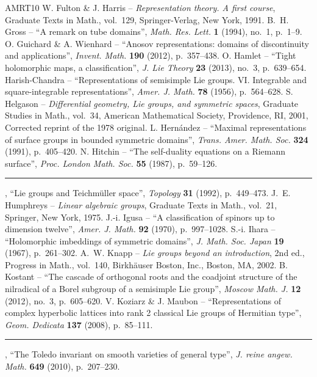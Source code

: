 \documentclass[10pt]{article}
\theoremstyle{definition}
\numberwithin{equation}{section}
\begin{document}
{\begin{thebibliography}{AMRT10}
 W. Fulton \& J. Harris -- \emph{Representation theory. A first course}, Graduate Texts in Math., vol.~129, Springer-Verlag, New York, 1991.
 B.~H. Gross -- ``A remark on tube domains'', \emph{Math. Res. Lett.} \textbf{1} (1994), no.~1, p.~1--9.
 O. Guichard \& A. Wienhard -- ``Anosov representations: domains of discontinuity and applications'', \emph{Invent. Math.} \textbf{190} (2012), p.~357--438.
 O. Hamlet -- ``Tight holomorphic maps, a classification'', \emph{J. Lie Theory} \textbf{23} (2013), no.~3, p.~639--654.
 Harish-Chandra -- ``Representations of semisimple Lie groups. VI. Integrable and square-integrable representations'', \emph{Amer. J. Math.} \textbf{78} (1956), p.~564--628.
 S. Helgason -- \emph{Differential geometry, Lie groups, and symmetric spaces}, Graduate Studies in Math., vol.~34, American Mathematical Society, Providence, RI, 2001, Corrected reprint of the 1978 original.
 L. Hernández -- ``Maximal representations of surface groups in bounded symmetric domains'', \emph{Trans. Amer. Math. Soc.} \textbf{324} (1991), p.~405--420.
 N. Hitchin -- ``The self-duality equations on a Riemann surface'', \emph{Proc. London Math. Soc.} \textbf{55} (1987), p.~59--126.
 \rule{1.2em}{.1pt}, ``Lie groups and Teichmüller space'', \emph{Topology} \textbf{31} (1992), p.~449--473.
 J.~E. Humphreys -- \emph{Linear algebraic groups}, Graduate Texts in Math., vol.~21, Springer, New York, 1975.
 J.-i. Igusa -- ``A classification of spinors up to dimension twelve'', \emph{Amer. J. Math.} \textbf{92} (1970), p.~997--1028.
 S.-i. Ihara -- ``Holomorphic imbeddings of symmetric domains'', \emph{J. Math. Soc. Japan} \textbf{19} (1967), p.~261--302.
 A.~W. Knapp -- \emph{Lie groups beyond an introduction}, 2nd ed., Progress in Math., vol.~140, Birkhäuser Boston, Inc., Boston, MA, 2002.
 B. Kostant -- ``The cascade of orthogonal roots and the coadjoint structure of the nilradical of a Borel subgroup of a semisimple Lie group'', \emph{Moscow Math. J.} \textbf{12} (2012), no.~3, p.~605--620.
 V. Koziarz \& J. Maubon -- ``Representations of complex hyperbolic lattices into rank 2 classical Lie groups of Hermitian type'', \emph{Geom. Dedicata} \textbf{137} (2008), p.~85--111.
 \rule{1.2em}{.1pt}, ``The Toledo invariant on smooth varieties of general type'', \emph{J. reine angew. Math.} \textbf{649} (2010), p.~207--230.

\end{thebibliography}}
\end{document}
